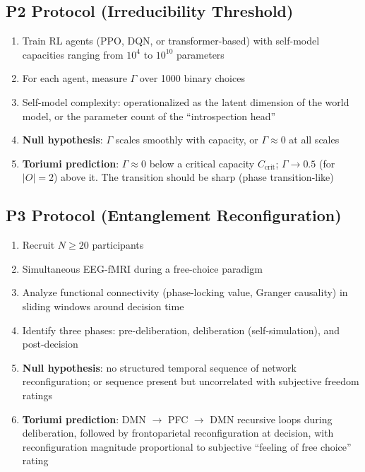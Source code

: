 \documentclass[12pt,a4paper]{article}
\theoremstyle{definition}
\theoremstyle{remark}
\begin{document}
\subsection*{P2 Protocol (Irreducibility Threshold)}

\begin{enumerate}[itemsep=0pt]
\item Train RL agents (PPO, DQN, or transformer-based) with self-model
  capacities ranging from $10^4$ to $10^{10}$ parameters
\item For each agent, measure $\Gamma$ over 1000 binary choices
\item Self-model complexity: operationalized as the latent dimension of the
  world model, or the parameter count of the ``introspection head''
\item \textbf{Null hypothesis}: $\Gamma$ scales smoothly with capacity, or
  $\Gamma \approx 0$ at all scales
\item \textbf{Toriumi prediction}: $\Gamma \approx 0$ below a critical
  capacity $C_{\text{crit}}$; $\Gamma \to 0.5$ (for $|O|=2$) above it.
  The transition should be sharp (phase transition-like)
\end{enumerate}

\subsection*{P3 Protocol (Entanglement Reconfiguration)}

\begin{enumerate}[itemsep=0pt]
\item Recruit $N \geq 20$ participants
\item Simultaneous EEG-fMRI during a free-choice paradigm
\item Analyze functional connectivity (phase-locking value, Granger causality)
  in sliding windows around decision time
\item Identify three phases: pre-deliberation, deliberation (self-simulation),
  and post-decision
\item \textbf{Null hypothesis}: no structured temporal sequence of network
  reconfiguration; or sequence present but uncorrelated with subjective
  freedom ratings
\item \textbf{Toriumi prediction}: DMN $\to$ PFC $\to$ DMN recursive loops
  during deliberation, followed by frontoparietal reconfiguration at decision,
  with reconfiguration magnitude proportional to subjective ``feeling of free
  choice'' rating
\end{enumerate}
\end{document}
